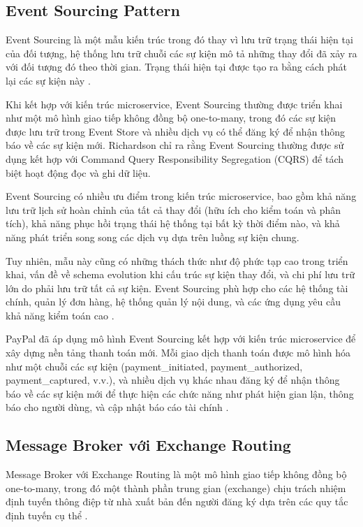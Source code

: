 \subsection{Event Sourcing Pattern}
Event Sourcing là một mẫu kiến trúc trong đó thay vì lưu trữ trạng thái hiện tại của đối tượng, hệ thống lưu trữ chuỗi các sự kiện mô tả những thay đổi đã xảy ra với đối tượng đó theo thời gian. Trạng thái hiện tại được tạo ra bằng cách phát lại các sự kiện này \cite{fowler2002}.

Khi kết hợp với kiến trúc microservice, Event Sourcing thường được triển khai như một mô hình giao tiếp không đồng bộ one-to-many, trong đó các sự kiện được lưu trữ trong Event Store và nhiều dịch vụ có thể đăng ký để nhận thông báo về các sự kiện mới. Richardson \cite{richardson2019} chỉ ra rằng Event Sourcing thường được sử dụng kết hợp với Command Query Responsibility Segregation (CQRS) để tách biệt hoạt động đọc và ghi dữ liệu.

Event Sourcing có nhiều ưu điểm trong kiến trúc microservice, bao gồm khả năng lưu trữ lịch sử hoàn chỉnh của tất cả thay đổi (hữu ích cho kiểm toán và phân tích), khả năng phục hồi trạng thái hệ thống tại bất kỳ thời điểm nào, và khả năng phát triển song song các dịch vụ dựa trên luồng sự kiện chung.

Tuy nhiên, mẫu này cũng có những thách thức như độ phức tạp cao trong triển khai, vấn đề về schema evolution khi cấu trúc sự kiện thay đổi, và chi phí lưu trữ lớn do phải lưu trữ tất cả sự kiện. Event Sourcing phù hợp cho các hệ thống tài chính, quản lý đơn hàng, hệ thống quản lý nội dung, và các ứng dụng yêu cầu khả năng kiểm toán cao \cite{richardson2019}.

PayPal đã áp dụng mô hình Event Sourcing kết hợp với kiến trúc microservice để xây dựng nền tảng thanh toán mới. Mỗi giao dịch thanh toán được mô hình hóa như một chuỗi các sự kiện (payment\_initiated, payment\_authorized, payment\_captured, v.v.), và nhiều dịch vụ khác nhau đăng ký để nhận thông báo về các sự kiện mới để thực hiện các chức năng như phát hiện gian lận, thông báo cho người dùng, và cập nhật báo cáo tài chính \cite{raman2016}.

\subsection{Message Broker với Exchange Routing}

Message Broker với Exchange Routing là một mô hình giao tiếp không đồng bộ one-to-many, trong đó một thành phần trung gian (exchange) chịu trách nhiệm định tuyến thông điệp từ nhà xuất bản đến người đăng ký dựa trên các quy tắc định tuyến cụ thể \cite{hohpe2004}.

